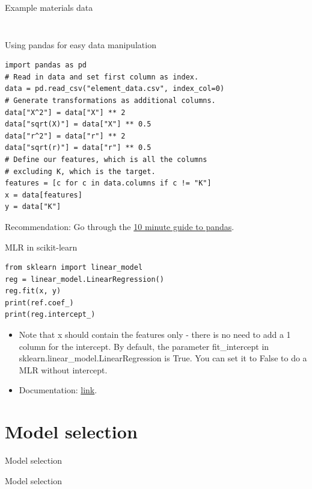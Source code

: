 \documentclass{beamer}
\begin{document}
\begin{frame}{Example materials data}
\begin{columns}
\begin{column}{0.4\textwidth}
\begin{figure}
    \end{figure}
    \end{column}
\end{columns}
\end{frame} 


\begin{frame}[fragile]{Using pandas for easy data manipulation}
    \begin{verbatim}
import pandas as pd
# Read in data and set first column as index.
data = pd.read_csv("element_data.csv", index_col=0)
# Generate transformations as additional columns.
data["X^2"] = data["X"] ** 2
data["sqrt(X)"] = data["X"] ** 0.5
data["r^2"] = data["r"] ** 2
data["sqrt(r)"] = data["r"] ** 0.5
# Define our features, which is all the columns
# excluding K, which is the target.
features = [c for c in data.columns if c != "K"]
x = data[features]
y = data["K"]
\end{verbatim}

Recommendation: Go through the \href{https://pandas.pydata.org/pandas-docs/stable/getting_started/10min.html}{10 minute guide to pandas}.
\end{frame} 


\begin{frame}[fragile]{MLR in scikit-learn}
\begin{verbatim}
from sklearn import linear_model
reg = linear_model.LinearRegression()
reg.fit(x, y)
print(ref.coef_)
print(reg.intercept_)
\end{verbatim}

\begin{itemize}
    \item Note that x should contain the features only - there is no need to add a 1 column for the intercept. By default, the parameter fit\_intercept in sklearn.linear\_model.LinearRegression is True. You can set it to False to do a MLR without intercept.
    \item Documentation: \href{https://scikit-learn.org/stable/modules/generated/sklearn.linear_model.LinearRegression.html}{link}.
\end{itemize}

\end{frame} 


\section{Model selection}

\begin{frame}{Model selection}
    \Huge{\centerline{Model selection}}
\end{frame} 
\end{document}
